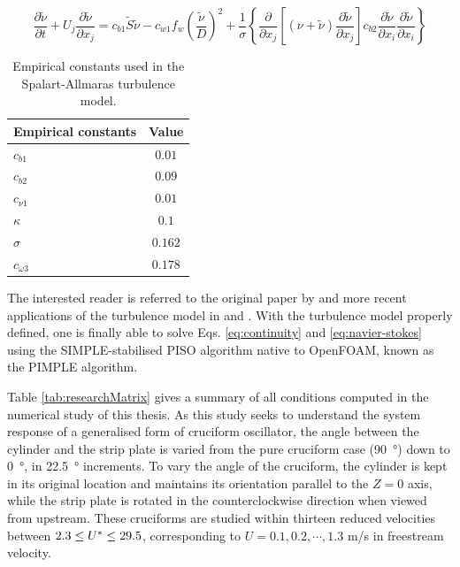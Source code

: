 \documentclass[oneside]{utmthesis}
\begin{document}
\begin{equation}
  \label{eq:kineticEddyTransport}
  \frac{\partial \tilde{\nu}}{\partial t} + U_{j} \frac{\partial \tilde{\nu}}{\partial x_{j}} = c_{b1}\tilde{S}\tilde{\nu} - c_{w1} f_{w} \left( \frac{\tilde{\nu}}{D} \right)^{2} + \frac{1}{\sigma} \left\{ \frac{\partial}{\partial x_{j}} \left[ \left( \nu + \tilde{\nu} \right) \frac{\partial \tilde{\nu}}{\partial x_{j}} \right] c_{b2} \frac{\partial \tilde{\nu}}{\partial x_{i}} \frac{\partial \tilde{\nu}}{\partial x_{i}} \right\}
\end{equation}

\begin{table}[!ht]
\centering
\caption{Empirical constants used in the Spalart-Allmaras turbulence model.} \label{tab:spalart-Allmaras}
\vspace{\baselineskip}
\begin{tabular}{l c}
  \hline
  \hline

  Empirical constants & Value    \\
  \hline

  $c_{b1}$            & $0.01$   \\
  $c_{b2}$            & $0.09$   \\
  $c_{\nu1}$          & $0.01$   \\
  $\kappa$            & $0.1$    \\
  $\sigma$            & $0.162$  \\
  $c_{\omega3}$       & $0.178$  \\
  \hline
  \hline
\end{tabular}
\end{table}

\noindent The interested reader is referred to the original paper by \citet{Spalart1992} and more recent applications of the turbulence model in \citet{Ding2019} and \citet{Sun2019b}. With the turbulence model properly defined, one is finally able to solve Eqs. \ref{eq:continuity} and \ref{eq:navier-stokes} using the SIMPLE-stabilised PISO algorithm native to OpenFOAM, known as the PIMPLE algorithm. 

Table \ref{tab:researchMatrix} gives a summary of all conditions computed in the numerical study of this thesis. As this study seeks to understand the system response of a generalised form of cruciform oscillator, the angle between the cylinder and the strip plate is varied from the pure cruciform case (\SI{90}{\degree}) down to \SI{0}{\degree}, in \SI{22.5}{\degree} increments. To vary the angle of the cruciform, the cylinder is kept in its original location and maintains its orientation parallel to the $Z=0$ axis, while the strip plate is rotated in the counterclockwise direction when viewed from upstream. These cruciforms are studied within thirteen reduced velocities between $2.3 \leq U^{*} \leq 29.5$, corresponding to $U = 0.1, 0.2, \cdots, 1.3$ m/s in freestream velocity. 
\end{document}
